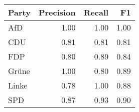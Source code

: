 \begin{table}[ht]
\centering
\begin{tabular}{lrrr}
  \hline
Party & Precision & Recall & F1 \\ 
  \hline
AfD & 1.00 & 1.00 & 1.00 \\ 
  CDU & 0.81 & 0.81 & 0.81 \\ 
  FDP & 0.80 & 0.89 & 0.84 \\ 
  Grüne & 1.00 & 0.80 & 0.89 \\ 
  Linke & 0.78 & 1.00 & 0.88 \\ 
  SPD & 0.87 & 0.93 & 0.90 \\ 
   \hline
\end{tabular}
\end{table}

